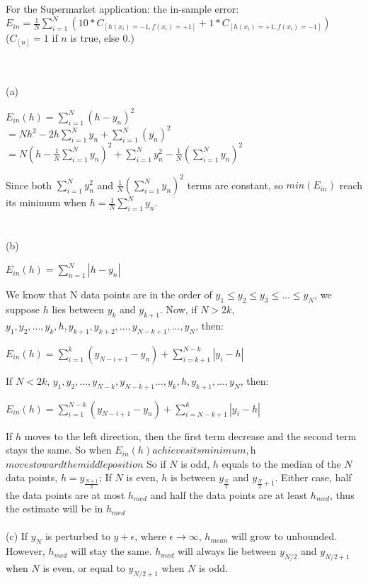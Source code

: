 \documentclass[12pt]{article}
\begin{document}
\begin{center}
For the Supermarket application: the in-sample error: 
$\displaystyle E_{in} = \frac{1}{N}\sum_{i=1}^{N} (10*C_{[h(x_i)=-1,f(x_i)=+1]} + 1*C_{[h(x_i)=+1,f(x_i)=-1]})$\\
($C_{[n]} = 1$ if $n$ is true, else 0.)
\end{center}

 \\\\
\indent(a) \begin{center} 
$\displaystyle E_{in}(h) = \sum_{i = 1}^{N}(h-y_n)^2$\\$\displaystyle = Nh^2 - 2h\sum_{i = 1}^{N}y_n + \sum_{i=1}^{N}(y_n)^2$\\$\displaystyle=N(h-\frac{1}{N}\sum_{i=1}^{N}y_n)^2 + \sum_{i=1}^{N}y_n^2 - \frac{1}{N}(\sum_{i=1}^{N}y_n)^2$ 
\end{center}
Since both $\displaystyle \sum_{i=1}^{N}y_n^2$ and $\displaystyle \frac{1}{N}(\sum_{i=1}^{N}y_n)^2$ terms are constant, so $min(E_{in})$ reach its minimum when $\displaystyle h = \frac{1}{N}\sum_{i=1}^{N}y_n$.\\\\\\
\indent(b) 
\begin{center}
$\displaystyle E_{in}(h) = \sum_{n=1}^{N}|h-y_n|$
\end{center}
\indent We know that N data points are in the order of $y_1 \leq y_2 \leq y_3 \leq ... \leq y_N$, we suppose $h$ lies between $y_k$ and $y_{k+1}$. Now, if $N > 2k$, $y_1, y_2, ... , y_k, h, y_{k+1}, y_{k+2}, ... , y_{N-k+1}, ... , y_N$, then: \\
\begin{center}
$\displaystyle E_{in}(h) = \sum_{i = 1}^{k}(y_{N-i+1} - y_n) + \sum_{i = k+1}^{N-k} |y_i - h|$
\end{center}
If $N < 2k$, $y_1, y_2, ... , y_{N-k}, y_{N-k+1} ... , y_k, h, y_{k+1}, ... , y_N$, then: \\
\begin{center}
$\displaystyle E_{in}(h) = \sum_{i = 1}^{N-k}(y_{N-i+1} - y_n) + \sum_{i = N-k+1}^{k} |y_i - h|$
\end{center}
If $h$ moves to the left direction, then the first term decrease and the second term stays the same. So when $E_{in}(h) achieves its minimum, $h$ moves toward the middle position$ So if $N$ is odd, $h$ equals to the median of the $N$ data points, $h = y_{\frac{N+1}{2}}$; If $N$ is even, $h$ is between $y_{\frac{N}{2}}$ and $y_{\frac{N}{2}+1}$. Either case, half the data points are at most $h_{med}$ and half the data points are at least $h_{med}$, thus the estimate will be in $h_{med}$\\\\
\indent(c)
If $y_N$ is perturbed to $y+\epsilon$, where $\epsilon\rightarrow\infty$, $h_{mean}$ will grow to unbounded. 
However, $h_{med}$ will stay the same. $h_{med}$ will always lie between $y_{N/2}$ and $y_{N/2+1}$ when $N$ is even, or equal to $y_{N/2+1}$ when $N$ is odd.
\end{document}
